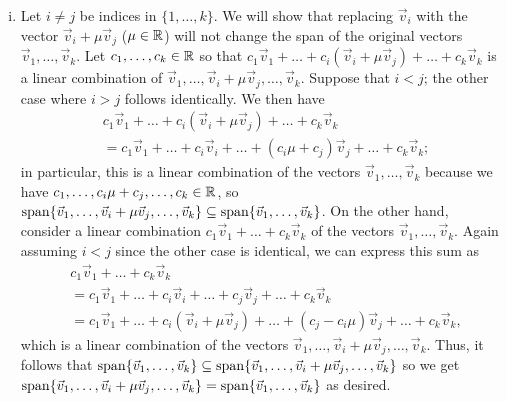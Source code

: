 \documentclass[main.tex]{subfiles}
\begin{document}
\begin{soln}
\begin{enumerate}[(i)]
        \item Let $i \neq j$ be indices in $\{1, \ldots , k\}$. We will show that replacing $\vec{v}_{i}$ with the vector $\vec{v}_{i} + \mu\vec{v}_{j}$ ($\mu \in \mathbb R$) will not change the span of the original vectors $\vec{v}_{1}, \ldots , \vec{v}_{k}$. Let $c_1, \ldots , c_k\in \mathbb R$ so that $c_1\vec{v}_{1} + \ldots + c_i(\vec{v}_{i} + \mu\vec{v}_{j}) + \ldots + c_k\vec{v}_{k}$ is a linear combination of $\vec{v}_{1}, \ldots , \vec{v}_{i} + \mu\vec{v}_{j}, \ldots , \vec{v}_{k}$. Suppose that $i < j$; the other case where $i > j$ follows identically. We then have
        \begin{align*}
            &c_1\vec{v}_{1} + \ldots + c_i(\vec{v}_{i} + \mu\vec{v}_{j}) + \ldots + c_k\vec{v}_{k} \\
            &= c_1\vec{v}_{1} + \ldots + c_i\vec{v}_{i} + \ldots + (c_i\mu + c_j)\vec{v}_{j} + \ldots + c_k\vec{v}_{k};
        \end{align*}
        in particular, this is a linear combination of the vectors $\vec{v}_{1}, \ldots , \vec{v}_{k}$ because we have $c_1, \ldots, c_i\mu + c_j, \ldots , c_k\in \mathbb R$, so $\operatorname{span}\{\vec{v}_{1}, \ldots , \vec{v}_{i} + \mu\vec{v}_{j}, \ldots , \vec{v}_{k}\}\subseteq \operatorname{span}\{\vec{v}_{1}, \ldots , \vec{v}_{k}\}$. On the other hand, consider a linear combination $c_1\vec{v}_{1} + \ldots + c_k\vec{v}_{k}$ of the vectors $\vec{v}_{1}, \ldots , \vec{v}_{k}$. Again assuming $i < j$ since the other case is identical, we can express this sum as
        \begin{align*}
            &c_1\vec{v}_{1} + \ldots + c_k\vec{v}_{k} \\
            &= c_1\vec{v}_{1} + \ldots + c_i\vec{v}_{i} + \ldots + c_j\vec{v}_{j} + \ldots + c_k\vec{v}_{k} \\
            &= c_1\vec{v}_{1} + \ldots + c_i(\vec{v}_{i} + \mu\vec{v}_{j}) + \ldots + (c_j - c_i\mu)\vec{v}_{j} + \ldots + c_k\vec{v}_{k},
        \end{align*}
        which is a linear combination of the vectors $\vec{v}_{1}, \ldots , \vec{v}_{i} + \mu\vec{v}_{j}, \ldots , \vec{v}_{k}$. Thus, it follows that $\operatorname{span}\{\vec{v}_{1}, \ldots , \vec{v}_{k}\}\subseteq \operatorname{span}\{\vec{v}_{1}, \ldots , \vec{v}_{i} + \mu\vec{v}_{j}, \ldots , \vec{v}_{k}\}$ so we get $\operatorname{span}\{\vec{v}_{1}, \ldots , \vec{v}_{i} + \mu\vec{v}_{j}, \ldots , \vec{v}_{k}\} = \operatorname{span}\{\vec{v}_{1}, \ldots , \vec{v}_{k}\}$ as desired.\qedhere
    \end{enumerate}
\end{soln}
\eject
\end{document}

